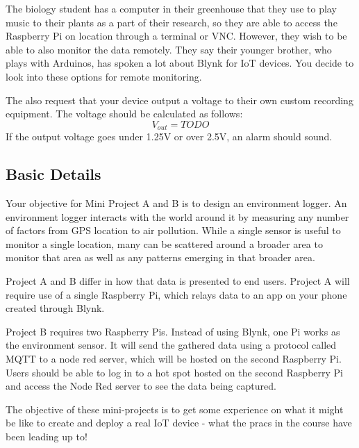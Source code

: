 The biology student has a computer in their greenhouse that they use to play music to their plants as a part of their research, so they are able to access the Raspberry Pi on location through a terminal or VNC. However, they wish to be able to also monitor the data remotely. They say their younger brother, who plays with Arduinos, has spoken a lot about Blynk for IoT devices. You decide to look into these options for remote monitoring. 

The also request that your device output a voltage to their own custom recording equipment. The voltage should be calculated as follows:
$$
V_{out} = TODO
$$
If the output voltage goes under 1.25V or over 2.5V, an alarm should sound.


\subsection{Basic Details}
Your objective for Mini Project A and B is to design an environment logger. An environment logger interacts with the world around it by measuring any number of factors from GPS location to air pollution. While a single sensor is useful to monitor a single location, many can be scattered around a broader area to monitor that area as well as any patterns emerging in that broader area.

Project A and B differ in how that data is presented to end users. Project A will require use of a single Raspberry Pi, which relays data to an app on your phone created through Blynk.

Project B requires two Raspberry Pis. Instead of using Blynk, one Pi works as the environment sensor. It will send the gathered data using a protocol called MQTT to a node red server, which will be hosted on the second Raspberry Pi. Users should be able to log in to a hot spot hosted on the second Raspberry Pi and access the Node Red server to see the data being captured.

The objective of these mini-projects is to get some experience on what it might be like to create and deploy a real IoT device - what the pracs in the course have been leading up to!






